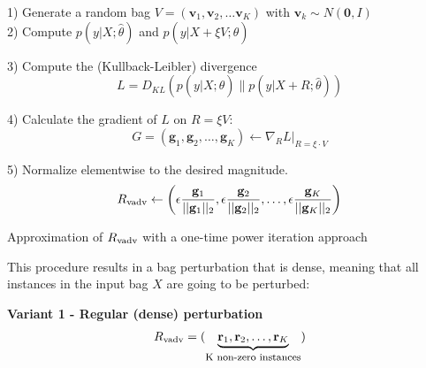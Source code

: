 \documentclass[journal,twoside,web]{ieeecolor}
\begin{document}
\begin{algorithm}[]
	\SetAlgoLined
	1) Generate a random bag $V = (\mathbf{v}_1, \mathbf{v}_2, \dots \mathbf{v}_K)$ 
	with $\mathbf{v}_k \sim N(\mathbf{0}, I)$\\
	
	2) Compute $p(y|X; \hat{\theta})$ and $p(y|X+\xi V; \hat{\theta})$
	
	3) Compute the (Kullback-Leibler) divergence 
	\begin{equation*}
		L = D_{KL}\left(p(y|X;\hat{\theta}) \parallel p(y|X+R;\hat{\theta})\right)
	\end{equation*}
	
	4) Calculate the gradient of $L$ on $R=\xi V$:
	\begin{equation*}
		G = (\mathbf{g}_1, \mathbf{g}_2, \dots, \mathbf{g}_K) \gets \nabla_R L |_{R=\xi \cdot V}
	\end{equation*}
	
	5) Normalize elementwise to the desired magnitude.
	\begin{equation*}
		R\textsubscript{vadv} \gets \left(\epsilon\frac{{\mathbf{g}}_1}{||\mathbf{g}_1||_2}, \epsilon\frac{\mathbf{g}_2}{||\mathbf{g}_2||_2}, \dots, \epsilon\frac{\mathbf{g}_K}{||\mathbf{g}_K||_2}\right)
	\end{equation*}
	
	\caption{Approximation of $R\textsubscript{vadv}$ with a one-time power iteration approach}
	\label{algo:vadv}
\end{algorithm} 


This procedure results in a bag perturbation that is dense, meaning
that all instances in the input bag $X$ are going to be perturbed:

\begin{center}
\textbf{Variant 1 - Regular (dense) perturbation}
	\begin{gather*}
		R\textsubscript{vadv} = \left(\smash[b]{\underbrace{\mathbf{r}_1, \mathbf{r}_2,
				\dots, \mathbf{r}_{K}}_{\text{\footnotesize K non-zero instances}}}\right)
	\end{gather*}
\end{center}
\end{document}
